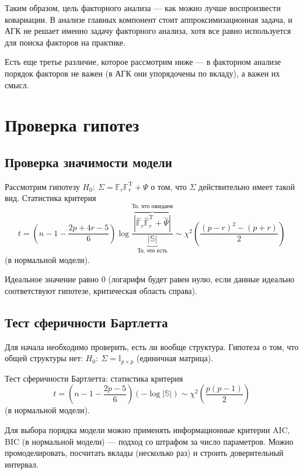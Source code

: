 \documentclass[specialist, 12pt,
subf, %
href, colorlinks=true,
substylefile = spbu.rtx,
]{disser}
\begin{document}
Таким образом, цель факторного анализа --- как можно лучше воспроизвести ковариации. В анализе главных компонент стоит аппроксимизационная задача, и АГК не решает именно задачу факторного анализа, хотя все равно используется для поиска факторов на практике.

Есть еще третье различие, которое рассмотрим ниже --- в факторном анализе порядок факторов не важен (в АГК они упорядочены по вкладу), а важен их смысл.

\section{Проверка гипотез}

\subsection{Проверка значимости модели}
Рассмотрим гипотезу $H_0:~ \Sigma=\mathbb{F}_r\mathbb{F}_r^\mathrm{T}+\Psi$ о том, что $\Sigma$ действительно имеет такой вид. Статистика критерия
\begin{equation*}
t=(n-1-\frac{2p+4r-5}{6})\log \frac{\overbrace{|\widehat{\mathbb{F}}_r\widehat{\mathbb{F}}_r^\mathrm{T}+\widehat{\Psi}|}^{\text{То, что ожидаем}}}{\underbrace{|\mathbb{S}|}_{\text{То, что есть}}} \sim \chi^2(\frac{(p-r)^2-(p+r)}{2})
\end{equation*}
(в нормальной модели).

Идеальное значение равно $0$ (логарифм будет равен нулю, если данные идеально соответствуют гипотезе, критическая область справа).

\subsection{Тест сферичности Бартлетта}
Для начала необходимо проверить, есть ли вообще структура. Гипотеза о том, что общей структуры нет: $H_0: ~ \Sigma=\mathbb{I}_{p\times p}$ (единичная матрица).

Тест сферичности Бартлетта: статистика критерия
\begin{equation*}
t=(n-1-\frac{2p-5}{6})(-\log |\mathbb{S}|) \sim \chi^2(\frac{p(p-1)}{2})
\end{equation*}
(в нормальной модели).

Для выбора порядка модели можно применять информационные критерии AIC, BIC (в нормальной модели) --- подход со штрафом за число параметров. Можно промоделировать, посчитать вклады (несколько раз) и строить доверительный интервал.
\end{document}
